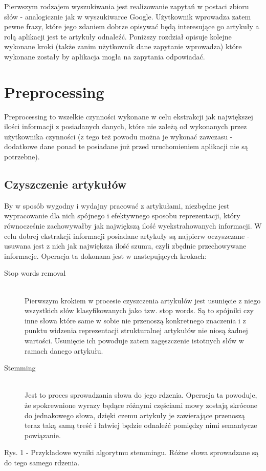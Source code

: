 Pierwszym rodzajem wyszukiwania jest realizowanie 
zapytań w postaci zbioru słów - analogicznie jak w wyszukiwarce Google. Użytkownik wprowadza zatem pewne frazy, które jego 
zdaniem dobrze opisywać będą interesujące go artykuły
 a rolą aplikacji jest te artykuły odnaleźć.
Poniższy rozdział opisuje kolejne wykonane kroki (także zanim użytkownik dane zapytanie wprowadza) które wykonane zostały by aplikacja mogła na zapytania odpowiadać.

\section{Preprocessing}
Preprocessing to wszelkie czynności wykonane w celu ekstrakcji jak największej ilości informacji z posiadanych danych, które nie zależą od wykonanych przez użytkownika czynności (z tego też powodu można je wykonać zawczasu - dodatkowe dane ponad te posiadane już przed uruchomieniem aplikacji nie są potrzebne).

\subsection{Czyszczenie artykułów}
By w sposób wygodny i wydajny pracować z artykułami, niezbędne jest wypracowanie dla nich spójnego i efektywnego sposobu reprezentacji, który równocześnie zachowywałby jak największą ilość wyekstrahowanych informacji. W celu dobrej ekstrakcji informacji posiadane artykuły są najpierw oczyszczane - usuwana jest z nich jak największa ilość szumu, czyli zbędnie przechowywane informacje.
Operacja ta dokonana jest w nastepujących krokach:

\begin{description}
  \item[Stop words removal] \hfill \\
 Pierwszym krokiem w procesie czyszczenia artykułów jest usunięcie z niego wszystkich słów klasyfikowanych jako tzw. stop words. Są to spójniki czy inne słowa które same w sobie nie przenoszą konkretnego znaczenia i z punktu widzenia reprezentacji strukturalnej artykułów nie niosą żadnej wartości. Usunięcie ich powoduje zatem zagęszczenie istotnych słów w ramach danego artykułu.
 
  \item[Stemming] \hfill \\
Jest to proces sprowadzania słowa do jego rdzenia. Operacja ta powoduje, że spokrewnione wyrazy będące różnymi częściami mowy zostają skrócone do jednakowego słowa, dzięki czemu artykuły je zawierające przenoszą teraz taką samą treść i łatwiej będzie odnaleźć pomiędzy nimi semantycze powiązanie.
\end{description}
\begin{center}
 
 Rys. 1 - Przykładowe wyniki algorytmu stemmingu. Różne słowa sprowadzane są do tego samego rdzenia.
\end{center}

